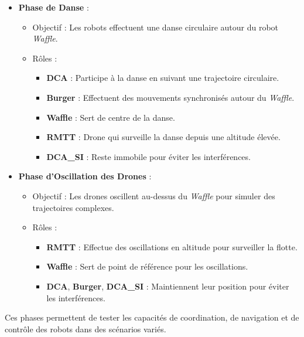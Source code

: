 \documentclass[a4paper,12pt]{article}
\begin{document}
\begin{itemize}
    \item \textbf{Phase de Danse} :
    \begin{itemize}
        \item Objectif : Les robots effectuent une danse circulaire autour du robot \textit{Waffle}.
        \item Rôles :
        \begin{itemize}
            \item \textbf{DCA} : Participe à la danse en suivant une trajectoire circulaire.
            \item \textbf{Burger} : Effectuent des mouvements synchronisés autour du \textit{Waffle}.
            \item \textbf{Waffle} : Sert de centre de la danse.
            \item \textbf{RMTT} : Drone qui surveille la danse depuis une altitude élevée.
            \item \textbf{DCA\_SI} : Reste immobile pour éviter les interférences.
        \end{itemize}
    \end{itemize}

    \item \textbf{Phase d'Oscillation des Drones} :
    \begin{itemize}
        \item Objectif : Les drones oscillent au-dessus du \textit{Waffle} pour simuler des trajectoires complexes.
        \item Rôles :
        \begin{itemize}
            \item \textbf{RMTT} : Effectue des oscillations en altitude pour surveiller la flotte.
            \item \textbf{Waffle} : Sert de point de référence pour les oscillations.
            \item \textbf{DCA}, \textbf{Burger}, \textbf{DCA\_SI} : Maintiennent leur position pour éviter les interférences.
        \end{itemize}
    \end{itemize}
\end{itemize}

Ces phases permettent de tester les capacités de coordination, de navigation et de contrôle des robots dans des scénarios variés.
\end{document}
